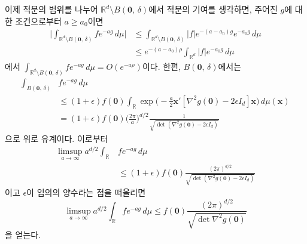 \documentclass[11pt,onecolumn,twoside,a4size]{gsag3jnl}
\begin{document}
이제 적분의 범위를 나누어 $\mathbb{R}^d\setminus B(\mathbf{0},\,\delta)$에서 적분의 기여를 생각하면, 주어진 $g$에 대한 조건으로부터 $a\geq a_0$이면 
\begin{align}
  \bigg|\int_{\mathbb{R}^d\setminus B(\mathbf{0},\,\delta)}fe^{-ag}\,d\mu\bigg|&\leq\int_{\mathbb{R}^d\setminus B(\mathbf{0},\,\delta)}|f|e^{-(a-a_0)g}e^{-a_0g}\,d\mu\\
  &\leq e^{-(a-a_0)\rho}\int_{\mathbb{R}^d}|f|e^{-a_0g}\,d\mu\nonumber
\end{align}
에서 $\int_{\mathbb{R}^d\setminus B(\mathbf{0},\,\delta)}fe^{-ag}\,d\mu=O(e^{-a\rho})$이다. 한편, $B(\mathbf{0},\,\delta)$에서는
\begin{align}
  \int_{B(\mathbf{0},\,\delta)}&fe^{-ag}\,d\mu\\
  &\leq(1+\epsilon)f(\mathbf{0})\int_{\mathbb{R}} \exp\bigg(-\frac{a}{2}\mathbf{x}'[\nabla^2g(\mathbf{0})-2\epsilon I_d]\mathbf{x}\bigg)\,d\mu(\mathbf{x})\nonumber\\
  &=(1+\epsilon)f(\mathbf{0})\bigg(\frac{2\pi}{a}\bigg)^{d/2}\frac{1}{\sqrt{\det(\nabla^2 g(\mathbf{0})-2\epsilon I_d)}}\nonumber
\end{align}
으로 위로 유계이다. 이로부터
\begin{align}
  \limsup_{a\to\infty}a^{d/2}\int_{\mathbb{R}}&fe^{-ag}\,d\mu\\
  &\leq(1+\epsilon)f(\mathbf{0})\frac{(2\pi)^{d/2}}{\sqrt{\det(\nabla^2 g(\mathbf{0})-2\epsilon I_d)}}\nonumber
\end{align}
이고 $\epsilon$이 임의의 양수라는 점을 떠올리면
\begin{equation}\label{eq:limsup}
  \limsup_{a\to\infty}a^{d/2}\int_{\mathbb{R}}fe^{-ag}\,d\mu\leq f(\mathbf{0})\frac{(2\pi)^{d/2}}{\sqrt{\det\nabla^2 g(\mathbf{0})}}
\end{equation}
을 얻는다.
\end{document}
